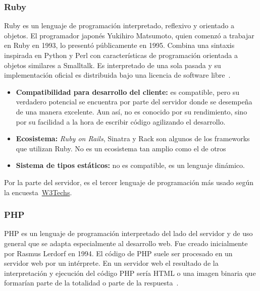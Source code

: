 \subsubsection{Ruby}

Ruby es un lenguaje de programación interpretado, reflexivo y orientado a objetos. El programador japonés Yukihiro Matsumoto, quien comenzó a trabajar en Ruby en 1993, lo presentó públicamente en 1995. Combina una sintaxis inspirada en Python y Perl con características de programación orientada a objetos similares a Smalltalk. Es interpretado de una sola pasada y su implementación oficial es distribuida bajo una licencia de software libre~\cite{ruby-wiki}.

\begin{itemize}
    \item[\mal] \textbf{Compatibilidad para desarrollo del cliente:} es compatible, pero su verdadero potencial se encuentra por parte del servidor donde se desempeña de una manera excelente. Aun así, no es conocido por su rendimiento, sino por su facilidad a la hora de escribir código agilizando el desarrollo.
    \item[\bien] \textbf{Ecosistema:} \textit{Ruby on Rails}, Sinatra y Rack son algunos de los frameworks que utilizan Ruby. No es un ecosistema tan amplio como el de otros 
    \item[\mal] \textbf{Sistema de tipos estáticos:} no es compatible, es un lenguaje dinámico.
\end{itemize}

Por la parte del servidor, es el tercer lenguaje de programación más usado según la encuesta~\href{https://w3techs.com/technologies/overview/programming_language}{W3Techs}.

\subsubsection{\MakeUppercase{Php}}

PHP es un lenguaje de programación interpretado del lado del servidor y de uso general que se adapta especialmente al desarrollo web. Fue creado inicialmente por Rasmus Lerdorf en 1994. El código de PHP suele ser procesado en un servidor web por un intérprete. En un servidor web el resultado de la interpretación y ejecución del código PHP sería HTML o una imagen binaria que formarían parte de la totalidad o parte de la respuesta~\cite{php-wiki}.


